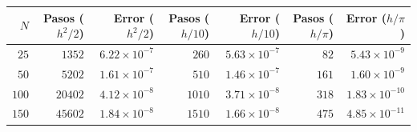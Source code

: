 \begin{tabular}{r r r r r r r}
\toprule
\rowcolor{Azul1!50}
$N$ & Pasos ($h^2/2$) & Error ($h^2/2$) & Pasos ($h/10$) & Error ($h/10$) & Pasos ($h/\pi$) & Error ($h/\pi$) \\
\midrule
$25$ & $1352$ & $6.22\times10^{-7}$ & $260$ & $5.63\times10^{-7}$ & $82$ & $5.43\times10^{-9}$ \\
$50$ & $5202$ & $1.61\times10^{-7}$ & $510$ & $1.46\times10^{-7}$ & $161$ & $1.60\times10^{-9}$ \\
$100$ & $20402$ & $4.12\times10^{-8}$ & $1010$ & $3.71\times10^{-8}$ & $318$ & $1.83\times10^{-10}$ \\
$150$ & $45602$ & $1.84\times10^{-8}$ & $1510$ & $1.66\times10^{-8}$ & $475$ & $4.85\times10^{-11}$ \\
\bottomrule
\end{tabular}
